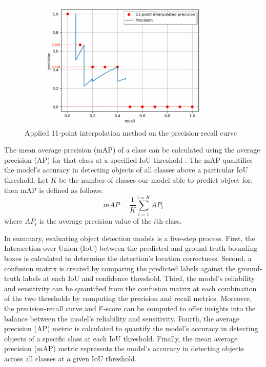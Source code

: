 \begin{figure}[!ht]
    \centering
    \includegraphics[width=4in]{figures/11AP_ex.png}
    \caption{Applied 11-point interpolation method on the precision-recall curve \cite{metrics_survey_2020}}
    \label{fig:11AP_ex}
\end{figure}

The mean average precision (mAP) of a class can be calculated using the average precision (AP) for that class at a specified IoU threshold \cite{szeliski_cv_book}. The mAP quantifies the model's accuracy in detecting objects of all classes above a particular IoU threshold. Let $K$ be the number of classes our model able to predict object for, then mAP is defined as follows:
\begin{equation}
    mAP = \frac{1}{K} \sum_{i=1}^{i=K}AP_i
\end{equation}
where $AP_i$ is the average precision value of the $i$th class.

In summary, evaluating object detection models is a five-step process. First, the Intersection over Union (IoU) between the predicted and ground-truth bounding boxes is calculated to determine the detection's location correctness. Second, a confusion matrix is created by comparing the predicted labels against the ground-truth labels at each IoU and confidence threshold. Third, the model's reliability and sensitivity can be quantified from the confusion matrix at each combination of the two thresholds by computing the precision and recall metrics. Moreover, the precision-recall curve and F-score can be computed to offer insights into the balance between the model's reliability and sensitivity. Fourth, the average precision (AP) metric is calculated to quantify the model's accuracy in detecting objects of a specific class at each IoU threshold. Finally, the mean average precision (mAP) metric represents the model's accuracy in detecting objects across all classes at a given IoU threshold. 

